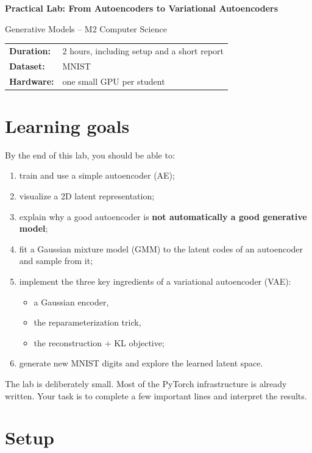 \documentclass[11pt,a4paper]{article}
\begin{document}
\begin{center}
  {\LARGE\bfseries Practical Lab: From Autoencoders to Variational Autoencoders}\par
  \vspace{0.5em}
  {\large Generative Models -- M2 Computer Science}\par
  \vspace{0.8em}
  \begin{tabular}{ll}
    \textbf{Duration:} & 2 hours, including setup and a short report \\
    \textbf{Dataset:} & MNIST \\
    \textbf{Hardware:} & one small GPU per student
  \end{tabular}
\end{center}

\vspace{0.8em}

\section*{Learning goals}

By the end of this lab, you should be able to:
\begin{enumerate}
  \item train and use a simple autoencoder (AE);
  \item visualize a 2D latent representation;
  \item explain why a good autoencoder is \textbf{not automatically a good generative model};
  \item fit a Gaussian mixture model (GMM) to the latent codes of an autoencoder and sample from it;
  \item implement the three key ingredients of a variational autoencoder (VAE):
  \begin{itemize}
    \item a Gaussian encoder,
    \item the reparameterization trick,
    \item the reconstruction + KL objective;
  \end{itemize}
  \item generate new MNIST digits and explore the learned latent space.
\end{enumerate}

The lab is deliberately small. Most of the PyTorch infrastructure is already written. Your task is to complete a few important lines and interpret the results.

\section{Setup}
\end{document}
